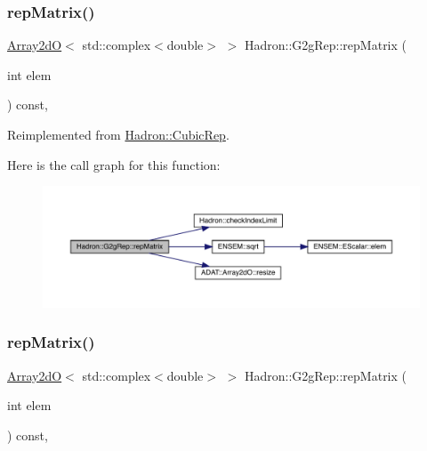 \subsubsection{\texorpdfstring{repMatrix()}{repMatrix()}\hspace{0.1cm}{\footnotesize\ttfamily [2/3]}}
{\footnotesize\ttfamily \mbox{\hyperlink{classADAT_1_1Array2dO}{Array2dO}}$<$ std\+::complex$<$double$>$ $>$ Hadron\+::\+G2g\+Rep\+::rep\+Matrix (\begin{DoxyParamCaption}\item[{int}]{elem }\end{DoxyParamCaption}) const\hspace{0.3cm}{\ttfamily [inline]}, {\ttfamily [virtual]}}



Reimplemented from \mbox{\hyperlink{structHadron_1_1CubicRep_ac5d7e9e6f4ab1158b5fce3e4ad9e8005}{Hadron\+::\+Cubic\+Rep}}.

Here is the call graph for this function\+:
\nopagebreak
\begin{figure}[H]
\begin{center}
\leavevmode
\includegraphics[width=350pt]{d9/d3e/structHadron_1_1G2gRep_af178c31ae966d7c1025673a0889b7f6f_cgraph}
\end{center}
\end{figure}
\mbox{\label{structHadron_1_1G2gRep_af178c31ae966d7c1025673a0889b7f6f}} 
\subsubsection{\texorpdfstring{repMatrix()}{repMatrix()}\hspace{0.1cm}{\footnotesize\ttfamily [3/3]}}
{\footnotesize\ttfamily \mbox{\hyperlink{classADAT_1_1Array2dO}{Array2dO}}$<$ std\+::complex$<$double$>$ $>$ Hadron\+::\+G2g\+Rep\+::rep\+Matrix (\begin{DoxyParamCaption}\item[{int}]{elem }\end{DoxyParamCaption}) const\hspace{0.3cm}{\ttfamily [inline]}, {\ttfamily [virtual]}}



